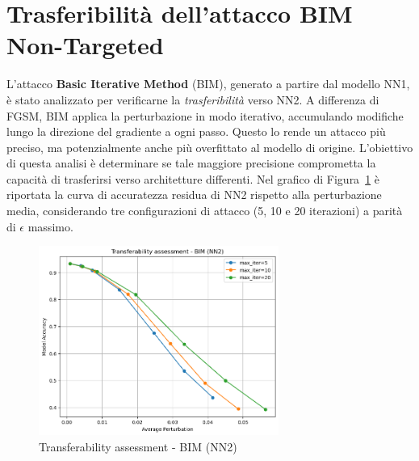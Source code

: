     \section{Trasferibilità dell'attacco BIM Non-Targeted}
        L'attacco \textbf{Basic Iterative Method} (BIM), generato a partire dal modello NN1, è stato analizzato per verificarne la \textit{trasferibilità} verso NN2. A differenza di FGSM, BIM applica la perturbazione in modo iterativo, accumulando modifiche lungo la direzione del gradiente a ogni passo. Questo lo rende un attacco più preciso, ma potenzialmente anche più overfittato al modello di origine. L’obiettivo di questa analisi è determinare se tale maggiore precisione comprometta la capacità di trasferirsi verso architetture differenti.
        Nel grafico di Figura~\ref{fig:bim_transfer} è riportata la curva di accuratezza residua di NN2 rispetto alla perturbazione media, considerando tre configurazioni di attacco (5, 10 e 20 iterazioni) a parità di $\epsilon$ massimo.

        \begin{figure}[H]
          \centering
          \includegraphics[width=0.7\textwidth]{images/untargBIMtrasf.png}
          \caption{Transferability assessment - BIM (NN2)}
          \label{fig:bim_transfer}
        \end{figure}

